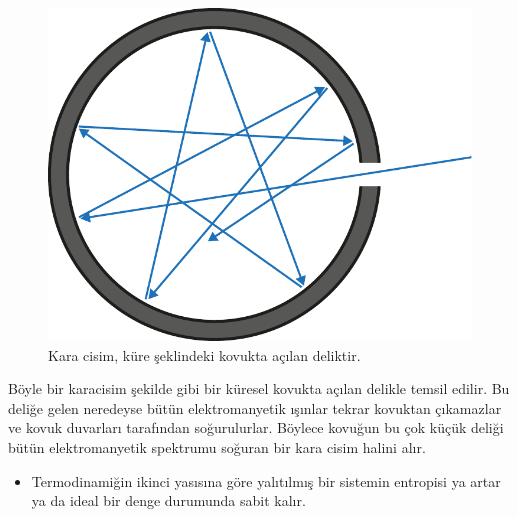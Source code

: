 \documentclass[a4paper,12pt, twoside]{article}
\begin{document}
\begin{figure}
\center
\includegraphics[scale=.5]{Black_body_realization.pdf}
\caption{Kara cisim, küre şeklindeki kovukta açılan deliktir.}
\label{fig:karacisim}
\end{figure}

Böyle bir karacisim şekilde gibi bir küresel kovukta açılan delikle temsil edilir. Bu deliğe gelen neredeyse bütün elektromanyetik ışınlar tekrar kovuktan çıkamazlar ve kovuk duvarları tarafından soğurulurlar. Böylece kovuğun bu çok küçük deliği bütün elektromanyetik spektrumu soğuran bir kara cisim halini alır.

\begin{itemize}
\item Termodinamiğin ikinci yasısına göre yalıtılmış bir sistemin entropisi ya artar ya da ideal bir denge durumunda sabit kalır.
\end{itemize}


\end{document}
